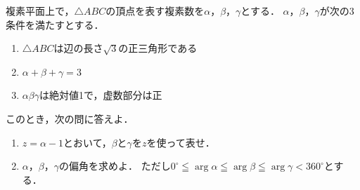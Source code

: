 \documentclass[../../main.tex]{subfiles}
\begin{document}
複素平面上で，$\triangle ABC$の頂点を表す複素数を$\alpha$，$\beta$，$\gamma$とする．
$\alpha$，$\beta$，$\gamma$が次の3条件を満たすとする．
\begin{enumerate}
  \item [1.]$\triangle ABC$は辺の長さ$\sqrt3$の正三角形である
  \item [2.]$\alpha+\beta+\gamma=3$
  \item [3.]$\alpha\beta\gamma$は絶対値1で，虚数部分は正
\end{enumerate}
このとき，次の問に答えよ．
\begin{enumerate}
  \item $z=\alpha-1$とおいて，$\beta$と$\gamma$を$z$を使って表せ．
  \item $\alpha$，$\beta$，$\gamma$の偏角を求めよ．
    ただし$0^\circ \leqq \arg\alpha \leqq \arg\beta \leqq \arg\gamma < {360}^\circ$とする．
\end{enumerate}
\end{document}
